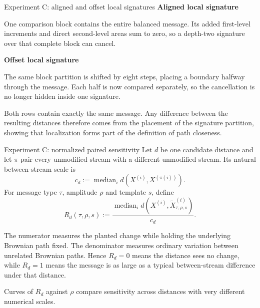 \documentclass[aspectratio=169,9pt]{beamer}
\begin{document}
\begin{frame}{Experiment C: aligned and offset local signatures}
  \textbf{Aligned local signature}\par
  One comparison block contains the entire balanced message. Its added first-level increments and direct second-level areas sum to zero, so a depth-two signature over that complete block can cancel.

  \textbf{Offset local signature}\par
  The same block partition is shifted by eight steps, placing a boundary halfway through the message. Each half is now compared separately, so the cancellation is no longer hidden inside one signature.

  \begin{center}
  \end{center}

  \small Both rows contain exactly the same message. Any difference between the resulting distances therefore comes from the placement of the signature partition, showing that localization forms part of the definition of path closeness.
\end{frame}

\begin{frame}{Experiment C: normalized paired sensitivity}
  Let $d$ be one candidate distance and let $\pi$ pair every unmodified stream with a different unmodified stream. Its natural between-stream scale is
  \[
    c_d:=\operatorname{median}_i d\!\left(X^{(i)},X^{(\pi(i))}\right).
  \]
  For message type $\tau$, amplitude $\rho$ and template $s$, define
  \[
    R_d(\tau,\rho,s)
    :=\frac{\operatorname{median}_i
      d\!\left(X^{(i)},\widetilde X^{(i)}_{\tau,\rho,s}\right)}{c_d}.
  \]

  The numerator measures the planted change while holding the underlying Brownian path fixed. The denominator measures ordinary variation between unrelated Brownian paths. Hence $R_d=0$ means the distance sees no change, while $R_d=1$ means the message is as large as a typical between-stream difference under that distance.

  Curves of $R_d$ against $\rho$ compare sensitivity across distances with very different numerical scales.
\end{frame}
\end{document}
